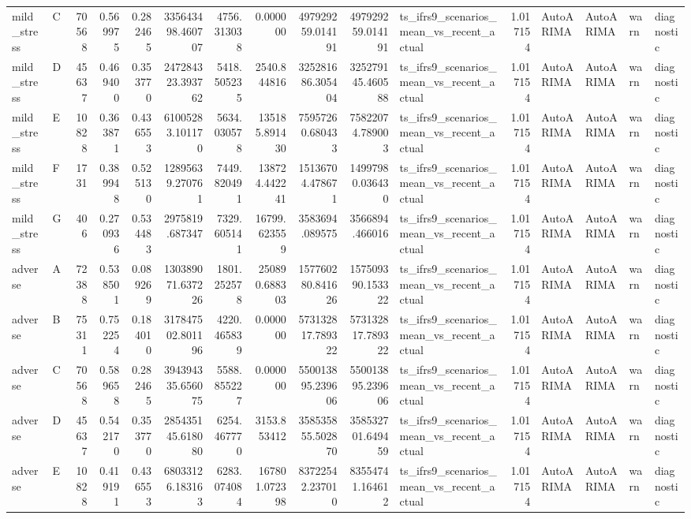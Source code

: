 \begin{tabular}{llrrrrrrrrlrllll}
mild_stress & C & 70568 & 0.569975 & 0.282465 & 335643498.460707 & 4756.313038 & 0.000000 & 497929259.014191 & 497929259.014191 & ts_ifrs9_scenarios_mean_vs_recent_actual & 1.017154 & AutoARIMA & AutoARIMA & warn & diagnostic \\
mild_stress & D & 45637 & 0.469400 & 0.353770 & 247284323.393762 & 5418.505235 & 2540.844816 & 325281686.305404 & 325279145.460588 & ts_ifrs9_scenarios_mean_vs_recent_actual & 1.017154 & AutoARIMA & AutoARIMA & warn & diagnostic \\
mild_stress & E & 10828 & 0.363871 & 0.436553 & 61005283.101170 & 5634.030578 & 135185.891430 & 75957260.680433 & 75822074.789003 & ts_ifrs9_scenarios_mean_vs_recent_actual & 1.017154 & AutoARIMA & AutoARIMA & warn & diagnostic \\
mild_stress & F & 1731 & 0.389948 & 0.525130 & 12895639.270761 & 7449.820491 & 138724.442241 & 15136704.478671 & 14997980.036430 & ts_ifrs9_scenarios_mean_vs_recent_actual & 1.017154 & AutoARIMA & AutoARIMA & warn & diagnostic \\
mild_stress & G & 406 & 0.270936 & 0.534483 & 2975819.687347 & 7329.605141 & 16799.623559 & 3583694.089575 & 3566894.466016 & ts_ifrs9_scenarios_mean_vs_recent_actual & 1.017154 & AutoARIMA & AutoARIMA & warn & diagnostic \\
adverse & A & 72388 & 0.538501 & 0.089269 & 130389071.637226 & 1801.252578 & 250890.688303 & 157760280.841626 & 157509390.153322 & ts_ifrs9_scenarios_mean_vs_recent_actual & 1.017154 & AutoARIMA & AutoARIMA & warn & diagnostic \\
adverse & B & 75311 & 0.752254 & 0.184010 & 317847502.801196 & 4220.465839 & 0.000000 & 573132817.789322 & 573132817.789322 & ts_ifrs9_scenarios_mean_vs_recent_actual & 1.017154 & AutoARIMA & AutoARIMA & warn & diagnostic \\
adverse & C & 70568 & 0.589658 & 0.282465 & 394394335.656075 & 5588.855227 & 0.000000 & 550013895.239606 & 550013895.239606 & ts_ifrs9_scenarios_mean_vs_recent_actual & 1.017154 & AutoARIMA & AutoARIMA & warn & diagnostic \\
adverse & D & 45637 & 0.542170 & 0.353770 & 285435145.618080 & 6254.467770 & 3153.853412 & 358535855.502870 & 358532701.649459 & ts_ifrs9_scenarios_mean_vs_recent_actual & 1.017154 & AutoARIMA & AutoARIMA & warn & diagnostic \\
adverse & E & 10828 & 0.419191 & 0.436553 & 68033126.183163 & 6283.074084 & 167801.072398 & 83722542.237010 & 83554741.164612 & ts_ifrs9_scenarios_mean_vs_recent_actual & 1.017154 & AutoARIMA & AutoARIMA & warn & diagnostic \\

\end{tabular}
